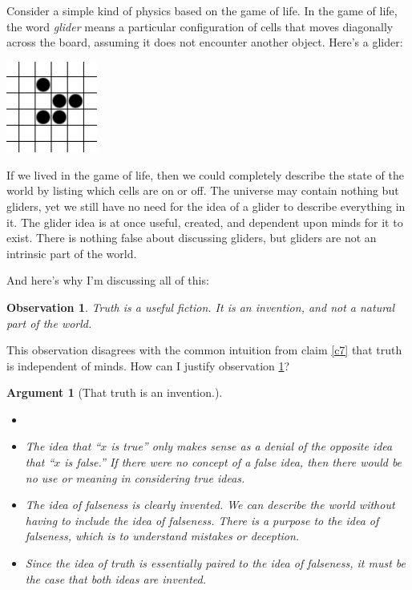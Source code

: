 \documentclass[11pt, oneside]{article}   	%
\newtheorem{obs}{Observation}
\newtheorem{argt}{Argument}
\begin{document}
Consider a simple kind of physics based on the game of life.
In the game of life, the word {\em glider} means a particular 
configuration of cells that moves diagonally across the board, assuming it does
not encounter another object. Here's a glider:
\begin{center}
\includegraphics[height=3cm]{glider.png}
\end{center}
If we lived in the game of life, then we could completely describe the state of
the world by listing which cells are on or off.
The universe may contain nothing but gliders, yet we still have no need
for the idea of a glider to describe everything in it.
The glider idea is at once useful, created, and dependent upon minds for it to
exist.
There is nothing false about discussing gliders, but gliders are not an
intrinsic part of the world.

And here's why I'm discussing all of this:
\begin{obs}\label{o3}
    Truth is a useful fiction. It is an invention, and not a natural part of the
    world.
\end{obs}

This observation disagrees with the common intuition from claim \ref{c7} that
truth is independent of minds. How can I justify observation \ref{o3}?

\begin{argt}[That truth is an invention.]\label{a2}
    \normalfont
    \begin{itemize}
        \item[]
        \item
    The idea that ``$x$ is true'' only makes sense as a denial of the opposite
    idea that ``$x$ is false.'' If there were no concept of a false idea, then
            there would be no use or meaning in considering true ideas.
        \item
            The idea of falseness is clearly invented. We can describe
            the world without having to include the idea of falseness.
            There is a purpose to the idea of falseness, which is to understand
            mistakes or deception.
        \item
            Since the idea of truth is essentially paired to the idea of
            falseness,
            it must be the case that both ideas are invented.
    \end{itemize}
\end{argt}
\end{document}
